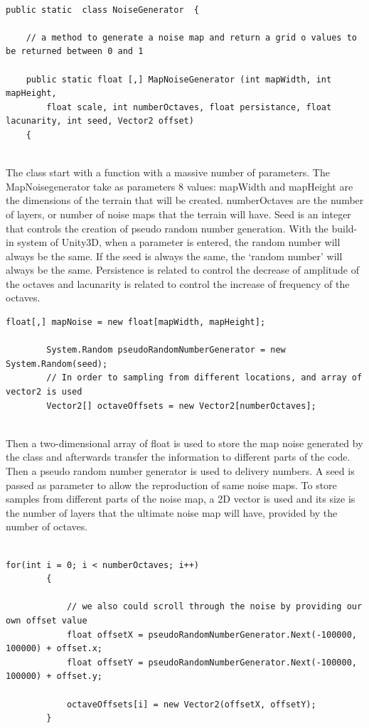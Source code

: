 \documentclass[a4paper,12pt]{book}
\begin{document}
\begin{lstlisting}
  
public static  class NoiseGenerator  {

    // a method to generate a noise map and return a grid o values to be returned between 0 and 1

    public static float [,] MapNoiseGenerator (int mapWidth, int mapHeight, 
        float scale, int numberOctaves, float persistance, float lacunarity, int seed, Vector2 offset)
    {
    
\end{lstlisting}

The class start with a function with a massive number of parameters. 
The MapNoisegenerator take as parameters 8 values: mapWidth and mapHeight are the dimensions of the terrain that will be created. numberOctaves are the number of layers, or number of noise maps that the terrain will have. Seed is an integer that controls the creation of pseudo random number generation. With the build-in system of Unity3D, when a parameter is entered, the random number will always be the same. If the seed is always the same, the ‘random number’ will always be the same.
Persistence is related to control the decrease of amplitude of the octaves and lacunarity is related to control the increase of frequency of the octaves.


\begin{lstlisting}
float[,] mapNoise = new float[mapWidth, mapHeight];

        System.Random pseudoRandomNumberGenerator = new System.Random(seed);
        // In order to sampling from different locations, and array of vector2 is used
        Vector2[] octaveOffsets = new Vector2[numberOctaves];


\end{lstlisting}

Then a two-dimensional array of float is used to store the map noise generated by the class and afterwards transfer the information to different parts of the code.
Then a pseudo random number generator is used to delivery numbers. A seed is passed as parameter to allow the reproduction of same noise maps.
To store samples from different parts of the noise map, a 2D vector is used and its size is the number of layers that the ultimate noise map will have, provided by the number of octaves.

\begin{lstlisting}

for(int i = 0; i < numberOctaves; i++)
        {

            // we also could scroll through the noise by providing our own offset value 
            float offsetX = pseudoRandomNumberGenerator.Next(-100000, 100000) + offset.x;
            float offsetY = pseudoRandomNumberGenerator.Next(-100000, 100000) + offset.y;

            octaveOffsets[i] = new Vector2(offsetX, offsetY);
        }

\end{lstlisting}
 
\end{document}
